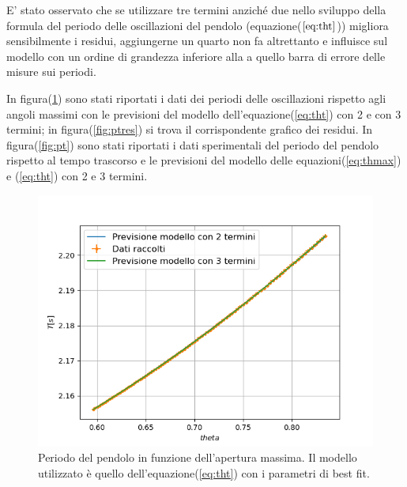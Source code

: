 \documentclass{article}
\begin{document}
E' stato osservato che se utilizzare tre termini anziché due nello sviluppo della formula del periodo delle oscillazioni del pendolo (equazione($\ref{eq:tht}$)) migliora sensibilmente i residui, aggiungerne un quarto non fa altrettanto e influisce sul modello con un ordine di grandezza inferiore alla a quello barra di errore delle misure sui periodi.

In figura(\ref{fig:pth}) sono stati riportati i dati dei periodi delle oscillazioni rispetto agli angoli massimi con le previsioni del modello dell'equazione(\ref{eq:tht}) con 2 e con 3 termini; in figura(\ref{fig:ptres}) si trova il corrispondente grafico dei residui.
In figura(\ref{fig:pt}) sono stati riportati i dati sperimentali del periodo del pendolo rispetto al tempo trascorso e le previsioni del modello delle equazioni(\ref{eq:thmax}) e  (\ref{eq:tht}) con 2 e 3 termini.



\begin{figure}[h!]
	\includegraphics[width=\textwidth]{Plot_Periods-Theta.png}
	\caption{Periodo del pendolo in funzione dell'apertura massima. Il modello utilizzato è quello dell'equazione({\ref{eq:tht}}) con i parametri di best fit. }
	\label{fig:pth}
\end{figure}
\end{document}
